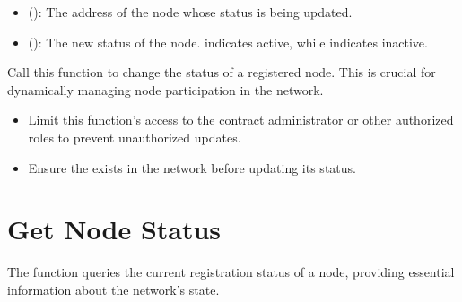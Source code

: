 \documentclass[letterpaper,10pt,english]{sphinxmanual}
\begin{document}
\sphinxAtStartPar
{}

\sphinxAtStartPar
{}
\begin{itemize}
\item {} 
\sphinxAtStartPar
{} ():
The address of the node whose status is being updated.

\item {} 
\sphinxAtStartPar
{} ():
The new status of the node.  indicates active, while  indicates inactive.

\end{itemize}

\sphinxAtStartPar
{}

\sphinxAtStartPar
Call this function to change the status of a registered node. This is crucial for dynamically managing node participation in the network.

\sphinxAtStartPar
{}
\begin{itemize}
\item {} 
\sphinxAtStartPar
{} Limit this function’s access to the contract administrator or other authorized roles to prevent unauthorized updates.

\item {} 
\sphinxAtStartPar
{} Ensure the  exists in the network before updating its status.

\end{itemize}


\section{Get Node Status}
\label{\detokenize{docs_node_manager_contract:get-node-status}}
\sphinxAtStartPar
The  function queries the current registration status of a node, providing essential information about the network’s state.

\sphinxAtStartPar
{}
\end{document}
